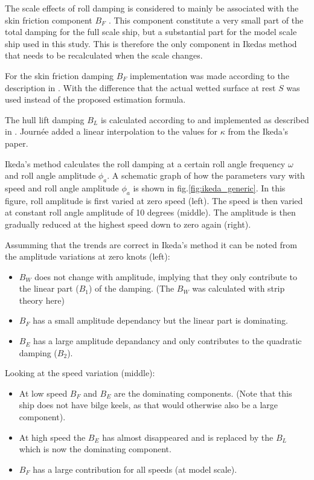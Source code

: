 The scale effects of roll damping is considered to mainly be associated
with the skin friction component $B_F$ \cite{7505983/FB64RGPF}. This
component constitute a very small part of the total damping for the full
scale ship, but a substantial part for the model scale ship used in this
study. This is therefore the only component in Ikedas method that needs
to be recalculated when the scale changes.

For the skin friction damping $B_F$ implementation was made according
to the description in \cite{7505983/UGK6YEVD}. With the difference that
the actual wetted surface at rest $S$ was used instead of the proposed
estimation formula.

The hull lift damping $B_L$ is calculated according to
\cite{7505983/937PN5DT} and implemented as described in
\cite{7505983/UYUAYY7E}. Journ\'ee added a linear interpolation to the
values for $\kappa$ from the Ikeda's paper.

Ikeda's method calculates the roll damping at a certain roll angle
frequency $\omega$ and roll angle amplitude $\phi_a$. A schematic
graph of how the parameters vary with speed and roll angle amplitude
$\phi_a$ is shown in fig.\ref{fig:ikeda_generic}. In this
figure, roll amplitude is first varied at zero speed (left). The speed
is then varied at constant roll angle amplitude of 10 degrees (middle).
The amplitude is then gradually reduced at the highest speed down to
zero again (right).

Assumming that the trends are correct in Ikeda's method it can be noted
from the amplitude variations at zero knots (left):

\begin{itemize}
\item $B_W$ does not change with amplitude, implying that they only contribute to the linear part ($B_1$) of the damping. (The $B_W$ was calculated with strip theory here)
\item $B_F$ has a small amplitude dependancy but the linear part is dominating.
\item $B_E$ has a large amplitude depandancy and only contributes to the quadratic damping ($B_2$)\cite{7505983/4AFVVGNT}.
\end{itemize}

Looking at the speed variation (middle):

\begin{itemize}
\item At low speed $B_F$ and $B_E$ are the dominating components. (Note that this ship does not have bilge keels, as that would otherwise also be a large component).
\item At high speed the $B_E$ has almost disappeared and is replaced by the $B_L$ which is now the dominating component.
\item $B_F$ has a large contribution for all speeds (at model scale).
\end{itemize}

